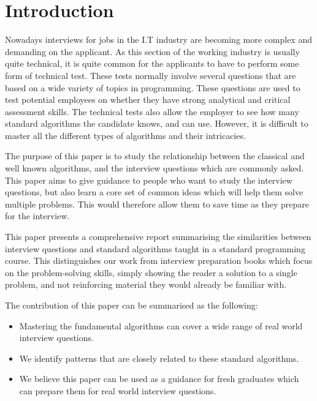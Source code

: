 \documentclass[10pt,twocolumn,hidelinks]{IEEEtran}
\begin{document}
\section{Introduction}
\label{sec:intro}
\par
Nowadays interviews for jobs in the I.T industry are becoming more complex and demanding on the applicant. As this section of the working industry is usually quite technical, it is quite common for the applicants to have to perform some form of technical test. These tests normally involve several questions that are based on a wide variety of topics in programming. These questions are used to test potential employees on whether they have strong analytical and critical assessment skills. The technical tests also allow the employer to see how many standard algorithms the candidate knows, and can use. However, it is difficult to master all the different types of algorithms and their intricacies. 
\par The purpose of this paper is to study the relationship between the classical and well known algorithms, and the interview questions which are commonly asked.  This paper aims to give guidance to people who want to study the interview questions, but also learn a core set of common ideas which will help them solve multiple problems. This would therefore allow them to save time as they prepare for the interview.
\par This paper presents a comprehensive report summarising the similarities between interview questions and standard algorithms taught in a standard programming course. This distinguishes our work from interview preparation books which focus on the problem-solving skills, simply showing the reader a solution to a single problem, and not reinforcing material they would already be familiar with. 
\par The contribution of this paper can be summarised as the following: 
\begin{itemize}
\item Mastering the fundamental algorithms can cover a wide range of real world interview questions. 
\item We identify patterns that are closely related to these standard algorithms. 
\item We believe this paper can be used as a guidance for fresh graduates which can prepare them for real world interview questions.  
\end{itemize}
\end{document}
